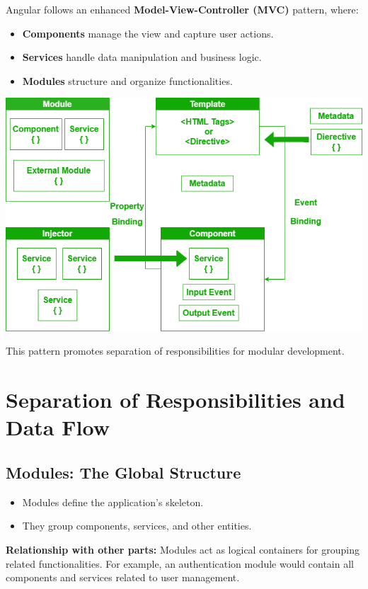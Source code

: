 \documentclass{article}
\begin{document}
Angular follows an enhanced \textbf{Model-View-Controller (MVC)} pattern, where:
\begin{itemize}
    \item \textbf{Components} manage the view and capture user actions.
    \item \textbf{Services} handle data manipulation and business logic.
    \item \textbf{Modules} structure and organize functionalities.
\end{itemize}
\begin{tcolorbox}[colframe=black!70, colback=white, title=Figure 3: Angular Architecture, fonttitle=\bfseries]
\centering
\includegraphics[width=\textwidth]{images/archi.png}
\end{tcolorbox}
This pattern promotes separation of responsibilities for modular development.

\section{Separation of Responsibilities and Data Flow}

\subsection{Modules: The Global Structure}
\begin{itemize}
    \item Modules define the application’s skeleton.
    \item They group components, services, and other entities.
\end{itemize}

\textbf{Relationship with other parts:}  
Modules act as logical containers for grouping related functionalities. For example, an authentication module would contain all components and services related to user management.
\end{document}
